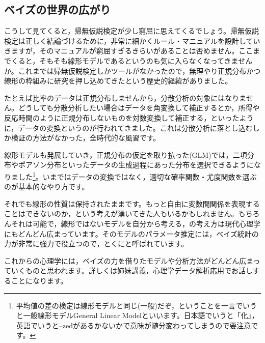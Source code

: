\documentclass{ltjbook}
\begin{document}
\subsection{ベイズの世界の広がり}
こうして見てくると，帰無仮説検定が少し窮屈に思えてくるでしょう。帰無仮説検定は正しく結論づけるために，非常に細かくルール・マニュアルを設計していきますが，そのマニュアルが窮屈すぎるきらいがあることは否めません。ここまでくると，そもそも線形モデルであるというのも気に入らなくなってきませんか。これまでは帰無仮説検定しかツールがなかったので，無理やり正規分布かつ線形の枠組みに研究を押し込めてきたという歴史的経緯がありました。

たとえば比率のデータは正規分布しませんから，分散分析の対象にはなりません。どうしても分散分析したい場合はデータを角変換して補正するとか，所得や反応時間のように正規分布しないものを対数変換して補正する，といったように，データの変換というのが行われてきました。これは分散分析に落とし込むしか検証の方法がなかった，全時代的な風習です。

線形モデルも発展していき，正規分布の仮定を取り払った(GLM)では，二項分布やポアソン分布といったデータの生成過程にあった分布を選択できるようになりました\footnote{平均値の差の検定は線形モデルと同じ(一般)だぞ，ということを一言でいうと一般線形モデルGeneral Linear Modelといいます。日本語でいうと「化」，英語でいうと--zedがあるかないかで意味が随分変わってしまうので要注意です。}。いまではデータの変換ではなく，適切な確率関数・尤度関数を選ぶのが基本的なやり方です。

それでも線形の性質は保持されたままです。もっと自由に変数間関係を表現することはできないのか，という考えが湧いてきた人もいるかもしれません。もちろんそれは可能で，線形ではないモデルを自分から考える，の考え方は現代心理学にもどんどん広まっています。そのモデルのパラメータ推定には，ベイズ統計の力が非常に強力で役立つので，とくにと呼ばれています。

これからの心理学には，ベイズの力を借りたモデルや分析方法がどんどん広まっていくものと思われます。詳しくは姉妹講義，心理学データ解析応用でお話しすることになります。
\end{document}
